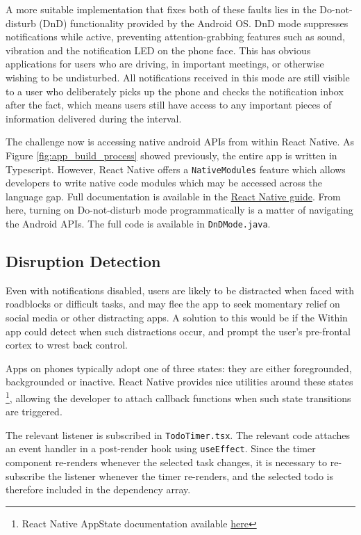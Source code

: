 A more suitable implementation that fixes both of these faults lies in the Do-not-disturb (DnD) functionality provided by the Android OS. DnD mode suppresses notifications while active, preventing attention-grabbing features such as sound, vibration and the notification LED on the phone face. This has obvious applications for users who are driving, in important meetings, or otherwise wishing to be undisturbed. All notifications received in this mode are still visible to a user who deliberately picks up the phone and checks the notification inbox after the fact, which means users still have access to any important pieces of information delivered during the interval.

The challenge now is accessing native android APIs from within React Native. As Figure \ref{fig:app_build_process} showed previously, the entire app is written in Typescript. However, React Native offers a \texttt{NativeModules} feature which allows developers to write native code modules which may be accessed across the language gap. Full documentation is available in the \href{https://reactnative.dev/docs/native-modules-intro}{React Native guide}. From here, turning on Do-not-disturb mode programmatically is a matter of navigating the Android APIs. The full code is available in \texttt{DnDMode.java}.


\subsection{Disruption Detection}
Even with notifications disabled, users are likely to be distracted when faced with roadblocks or difficult tasks, and may flee the app to seek momentary relief on social media or other distracting apps. A solution to this would be if the Within app could detect when such distractions occur, and prompt the user's pre-frontal cortex to wrest back control.

Apps on phones typically adopt one of three states: they are either foregrounded, backgrounded or inactive. React Native provides nice utilities around these states \footnote{React Native AppState documentation available \href{https://reactnative.dev/docs/next/appstate}{here}}, allowing the developer to attach callback functions when such state transitions are triggered.

The relevant listener is subscribed in \texttt{TodoTimer.tsx}. The relevant code attaches an event handler in a post-render hook using \texttt{useEffect}. Since the timer component re-renders whenever the selected task changes, it is necessary to re-subscribe the listener whenever the timer re-renders, and the selected todo is therefore included in the dependency array.

